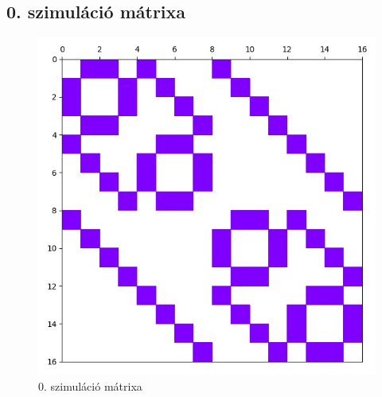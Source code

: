 \documentclass[14pt,a4paper]{article}
\begin{document}
\subsection{0. szimuláció mátrixa}
\begin{figure}[H]
\centering
\includegraphics[width = 0.7\columnwidth]{sim_00/simulation_matrix.jpg}
\caption{0. szimuláció mátrixa}
\end{figure}
\end{document}
